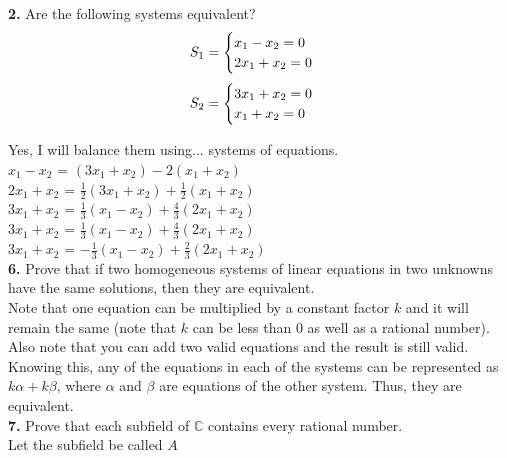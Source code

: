 \documentclass[11pt]{article}
\begin{document}
\textbf{2.}
Are the following systems equivalent?
\begin{equation}
  S_{1} = 
  \begin{cases}
    x_1 - x_2 = 0\\
    2x_1 + x_2 = 0
  \end{cases}\\
\end{equation}
\begin{equation}
  S_{2} = 
  \begin{cases}
    3x_1 + x_2 = 0\\
    x_1 + x_2 = 0
  \end{cases}\\
\end{equation}

Yes, I will balance them using... systems of equations.\\

$x_{1} - x_{2}$ = $(3x_1 + x_2) - 2(x_1 + x_2)$\\

$2x_{1} + x_{2}$ = $\frac{1}{2}(3x_1 + x_2) + \frac{1}{2}(x_1 + x_2)$\\

$3x_{1} + x_{2}$ = $\frac{1}{3}(x_1 - x_2) + \frac{4}{3}(2x_1 + x_2)$\\

$3x_{1} + x_{2}$ = $\frac{1}{3}(x_1 - x_2) + \frac{4}{3}(2x_1 + x_2)$\\

$3x_{1} + x_{2}$ = $-\frac{1}{3}(x_1 - x_2) + \frac{2}{3}(2x_1 + x_2)$\\

\newpage
\textbf{6.}
Prove that if two homogeneous systems of linear equations in two unknowns have the same solutions, then they are equivalent.\\

Note that one equation can be multiplied by a constant factor $k$ and it will remain the same (note that $k$ can be less than 0 as well as a rational number). Also note that you can add two valid equations and the result is still valid. Knowing this, any of the equations in each of the systems can be represented as $k\alpha + k\beta$, where $\alpha$ and $\beta$ are equations of the other system. Thus, they are equivalent.\\

\textbf{7.}
Prove that each subfield of $\mathbb{C}$ contains every rational number.\\

Let the subfield be called $A$\\
\end{document}
